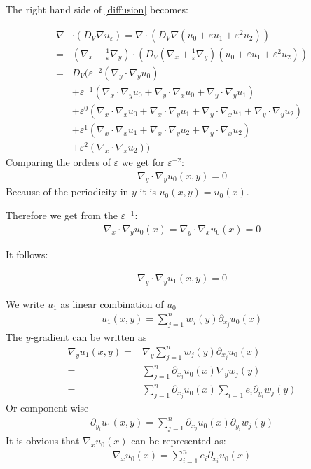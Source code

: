 \documentclass[10pt, a4paper]{article}
\begin{document}
 The right hand side of \eqref{diffusion} becomes:
 
 \begin{align*}
 \nabla &\cdot (D_V \nabla u_\varepsilon) = \nabla \cdot (D_V\nabla(u_0 + \varepsilon u_1 + \varepsilon^2 u_2)) \\
        =& (\nabla_x + \frac{1}{\varepsilon} \nabla_y) \cdot (D_V (\nabla_x + \frac{1}{\varepsilon} \nabla_y)(u_0 + \varepsilon u_1 + \varepsilon^2 u_2))\\
        =& D_V ( \varepsilon^{-2}( \nabla_y \cdot \nabla_y u_0) \\
        &+ \varepsilon^{-1}(\nabla_x \cdot \nabla_y u_0 + \nabla_y \cdot \nabla_x u_0 + \nabla_y \cdot \nabla_y u_1) \\
        &+ \varepsilon^0(\nabla_x \cdot \nabla_x u_0 + \nabla_x \cdot \nabla_y u_1 + \nabla_y \cdot \nabla_x u_1 + \nabla_y \cdot \nabla_y u_2 )\\ 
        &+ \varepsilon^1( \nabla_x \cdot \nabla_x u_1 + \nabla_x \cdot \nabla_y u_2 + \nabla_y \cdot \nabla_x u_2)\\
        &+ \varepsilon^2(\nabla_x \cdot \nabla_x u_2))
 \end{align*}
 Comparing the orders of $\varepsilon$ we get for $\varepsilon^{-2}$:
 \begin{align}
 \nabla_y \cdot \nabla_y u_0(x,y) = 0
 \end{align}
 Because of the periodicity in $y$ it is $u_0(x,y) = u_0(x)$.
 
 Therefore we get from the $\varepsilon^{-1}$:
 \begin{align}
 \nabla_x \cdot \nabla_y u_0(x) = \nabla_y \cdot \nabla_x u_0(x) = 0 
 \end{align}
 
 It follows:
 
 \begin{align}
 \nabla_y \cdot \nabla_y u_1(x,y) = 0
 \end{align}
 
 We write $u_1$ as linear combination of $u_0$
 \begin{align}
 \label{lin_combi_u_1}
 u_1(x,y) = \sum_{j=1}^n w_j(y) \partial_{x_j}u_0(x)
 \end{align}
 The $y$-gradient can be written as
 \begin{align}
 \label{gradienty u1}
 \nabla_y u_1(x,y) = & \nabla_y \sum_{j=1}^n w_j(y) \partial_{x_j}u_0(x)\\
                   = & \sum_{j=1}^n \partial_{x_j} u_0(x) \nabla_y w_j(y) \\
                   = & \sum_{j=1}^n \partial_{x_j} u_0(x) \sum_{i=1} e_i \partial_{y_i} w_j(y)
 \end{align}
 Or component-wise
 \begin{align*}
 \partial_{y_i} u_1(x,y) = \sum_{j=1}^n \partial_{x_j} u_0(x) \partial_{y_i}w_j(y)
 \end{align*}
It is obvious that $\nabla_x u_0(x)$ can be represented as:
  \begin{align}
 \nabla_x u_0(x) = \sum_{i=1}^n e_i \partial_{x_i}u_0(x)
 \end{align}
 
\end{document}
